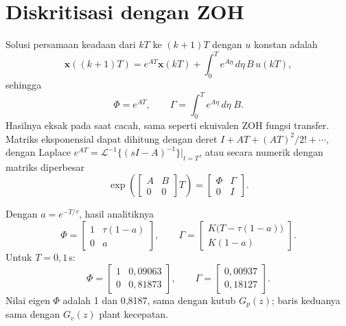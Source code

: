 \section{Diskritisasi dengan ZOH}
Solusi persamaan keadaan dari $kT$ ke $(k+1)T$ dengan $u$ konstan adalah
\begin{equation}
	\mathbf{x}((k+1)T) = e^{AT}\mathbf{x}(kT) + \int_0^Te^{A\eta}\,d\eta\,B\,u(kT),
\end{equation}
sehingga
\begin{equation}
	\Phi = e^{AT},\qquad \Gamma = \int_0^Te^{A\eta}\,d\eta\;B.
\end{equation}
Hasilnya eksak pada saat cacah, sama seperti ekuivalen ZOH fungsi transfer. Matriks eksponensial dapat dihitung dengan deret $I + AT + (AT)^2/2! + \cdots$, dengan Laplace $e^{AT} = \mathcal{L}^{-1}\{(sI-A)^{-1}\}|_{t=T}$, atau secara numerik dengan matriks diperbesar
\begin{equation}
	\exp\left(\begin{bmatrix}A & B\\ 0 & 0\end{bmatrix}T\right) = \begin{bmatrix}\Phi & \Gamma\\ 0 & I\end{bmatrix}.
\end{equation}

\begin{contoh}
	Dengan $a = e^{-T/\tau}$, hasil analitiknya
	\[
		\Phi = \begin{bmatrix}1 & \tau(1-a)\\ 0 & a\end{bmatrix},\qquad \Gamma = \begin{bmatrix}K\big(T - \tau(1-a)\big)\\ K(1-a)\end{bmatrix}.
	\]
	Untuk $T = 0{,}1$\,s:
	\[
		\Phi = \begin{bmatrix}1 & 0{,}09063\\ 0 & 0{,}81873\end{bmatrix},\qquad \Gamma = \begin{bmatrix}0{,}00937\\ 0{,}18127\end{bmatrix}.
	\]
	Nilai eigen $\Phi$ adalah 1 dan 0,8187, sama dengan kutub $G_p(z)$; baris keduanya sama dengan $G_v(z)$ plant kecepatan.
\end{contoh}


